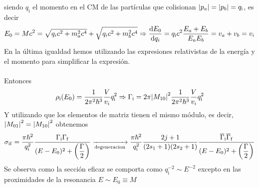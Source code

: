 siendo $q_\mathrm{i}$ el momento en el CM de las partículas que colisionan $\abs{p_a}=\abs{p_b}=q_\mathrm{i}$, es decir
\begin{equation}
    E_0=Mc^2=\sqrt{q_ic^2+m_a^2c^4}+\sqrt{q_ic^2+m_b^2c^4} \Rightarrow \dv{E_0}{q_i}=q_\mathrm{i}c^2 \frac{E_a+E_b}{E_aE_b}= v_a+v_b=v_i
\end{equation}
En la última igualdad hemos utilizando las expresiones relativistas de la energía y el momento para simplificar la expresión.\\\\
Entonces
\begin{equation}
    \rho_\mathrm{i}(E_0)=\frac{1}{2\pi^2\hbar^3}\frac{V}{v_i}q_\mathrm{i}^2 \Rightarrow \Gamma_\mathrm{i}=2\pi \abs{M_{10}}^2 \frac{1}{2\pi^2\hbar^3}\frac{V}{v_i}q_\mathrm{i}^2
    \label{eq: densidad de estados inicial de una resonancia}
\end{equation}
Y utilizando que los elementos de matriz tienen el mismo módulo, es decir, $\abs{M_{01}}^2=\abs{M_{10}}^2$ obtenemos
\begin{equation}
    \sigma_\mathrm{if}=\frac{\pi \hbar^2}{q_\mathrm{i}^2} \frac{\Gamma_\mathrm{i}\Gamma_\mathrm{f}}{(E-E_0)^2+ \qty(\dfrac{\Gamma}{2})} \xrightarrow[\text{degeneracion}]{}
    \frac{\pi \hbar^2}{q_\mathrm{i}^2} 
    \frac{2j+1}{(2s_1+1)(2s_2+1)}\frac{\overline{\Gamma}_\mathrm{i}\overline{\Gamma}_\mathrm{f}}{(E-E_0)^2+ \qty(\dfrac{\Gamma}{2})}
\end{equation}
Se observa como la sección eficaz se comporta como $q_\mathrm{i}^{-2}\sim E^{-2}$ excepto en las proximidades de la resonancia $E\sim E_0\equiv M$
